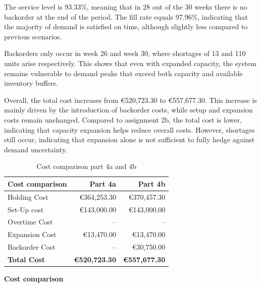 \documentclass[a4paper,faculty=eb,language=en,doctype=article,sftitles=false]{ugent-doc}
\begin{document}
The service level is 93.33\%, meaning that in 28 out of the 30 weeks there is no backorder at the end of the period. The fill rate equals 97.96\%, indicating that the majority of demand is satisfied on time, although slightly less compared to previous scenarios.

Backorders only occur in week 26 and week 30, where shortages of 13 and 110 units arise respectively. This shows that even with expanded capacity, the system remains vulnerable to demand peaks that exceed both capacity and available inventory buffers.

Overall, the total cost increases from €520{,}723.30 to €557{,}677.30. This increase is mainly driven by the introduction of backorder costs, while setup and expansion costs remain unchanged. Compared to assignment 2b, the total cost is lower, indicating that capacity expansion helps reduce overall costs. However, shortages still occur, indicating that expansion alone is not sufficient to fully hedge against demand uncertainty.

\begin{table}[H]
\centering
\begin{minipage}[c]{0.44\textwidth}
\centering
\begin{tabular}{lrr}
\toprule
\textbf{Cost comparison} & \textbf{Part 4a} & \textbf{Part 4b} \\
\midrule
Holding Cost   & €364{,}253.30 & €370{,}457.30 \\
Set-Up cost    & €143{,}000.00 & €143{,}000.00 \\
Overtime Cost  & --            & -- \\
Expansion Cost & €13{,}470.00  & €13{,}470.00 \\
Backorder Cost & --            & €30{,}750.00 \\
\midrule
\textbf{Total Cost} & \textbf{€520{,}723.30} & \textbf{€557{,}677.30} \\
\bottomrule
\end{tabular}
\end{minipage}
\hspace{0.06\textwidth}
\begin{minipage}[c]{0.44\textwidth}
\centering
\textbf{Cost comparison}

\vspace{0.3em}
\end{minipage}
\caption{Cost comparison part 4a and 4b}
\end{table}
\end{document}
